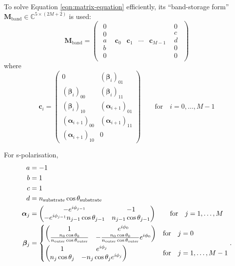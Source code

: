 \documentclass[]{article}
\begin{document}
	To solve Equation \ref{eqn:matrix-equation} efficiently, its ``band-storage form'' $\mathbf{M}_\text{band}\in \mathbb{C}^{5\times(2M+2)}$ is used:
	\begin{equation}
		\mathbf{M}_\text{band}=
		\begin{pmatrix}
			\begin{matrix}0\\0\\a\\b\\0\end{matrix}&\bm{c}_0&\bm{c}_1&\cdots&\bm{c}_{M-1}&\begin{matrix}0\\c\\d\\0\\0\end{matrix}
		\end{pmatrix}
	\end{equation}
	where
	\begin{equation}
		\bm{c}_i=
		\begin{pmatrix}
			0&(\bm{\beta}_i)_{01}\\
			(\bm{\beta}_i)_{00}&(\bm{\beta}_i)_{11}\\
			(\bm{\beta}_i)_{10}&(\bm{\alpha}_{i+1})_{01}\\
			(\bm{\alpha}_{i+1})_{00}&(\bm{\alpha}_{i+1})_{11}\\
			(\bm{\alpha}_{i+1})_{10}&0
		\end{pmatrix}\quad\quad\text{for}\quad i=0,\dots,M-1
	\end{equation}

	For s-polarisation,
	\begin{align}
		a&=-1\\
		b&=1\\
		c&=1\\
		d&=n_\text{substrate}\cos\theta_\text{substrate}\\
		\bm{\alpha}_j&=
		\begin{pmatrix}
			-e^{i\phi_{j-1}}&-1\\
			-e^{i\phi_{j-1}}n_{j-1}\cos\theta_{j-1}&n_{j-1}\cos\theta_{j-1}
		\end{pmatrix}\quad\quad\text{for}\quad j=1,\dots,M\\
		\bm{\beta}_j&=
		\begin{dcases}
			\begin{pmatrix}
				1&e^{i\phi_0}\\
				\frac{n_0\cos\theta_0}{n_\text{outer}\cos\theta_\text{outer}}&-\frac{n_0\cos\theta_0}{n_\text{outer}\cos\theta_\text{outer}}e^{i\phi_0}
			\end{pmatrix}&\text{for}\quad j=0\\
			\begin{pmatrix}
				1&e^{i\phi_j}\\
				n_j\cos\theta_j&-n_j\cos\theta_je^{i\phi_j}
			\end{pmatrix}&\text{for}\quad j=1,\dots,M-1
		\end{dcases}.
	\end{align}
\end{document}
